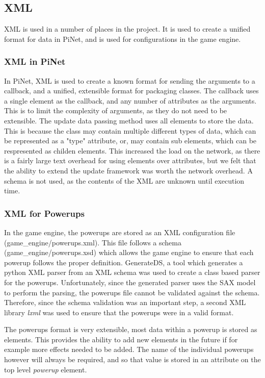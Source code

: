 \documentclass[letterpaper,fleqn]{article}
\begin{document}
\subsection{XML}
XML is used in a number of places in the project. It is used to create a unified format for data in PiNet, and is used for configurations in the game engine.
\subsubsection{XML in PiNet}
In PiNet, XML is used to create a known format for sending the arguments to a callback, and a unified, extensible format for packaging classes. The callback uses a single element as the callback, and any number of attributes as the arguments. This is to limit the complexity of arguments, as they do not need to be extensible. The update data passing method uses all elements to store the data. This is because the class may contain multiple different types of data, which can be represented as a "type" attribute, or, may contain sub elements, which can be respresented as childen elements. This increased the load on the network, as there is a fairly large text overhead for using elements over attributes, but we felt that the ability to extend the update framework was worth the network overhead. A schema is not used, as the contents of the XML are unknown until execution time.
\subsubsection{XML for Powerups}
In the game engine, the powerups are stored as an XML configuration file (game\_engine/powerups.xml). This file follows a schema (game\_engine/powerups.xsd) which allows the game engine to ensure that each powerup follows the proper definition. GenerateDS, a tool which generates a python XML parser from an XML schema was used to create a class based parser for the powerups. Unfortunately, since the generated parser uses the SAX model to perform the parsing, the powerups file cannot be validated against the schema. Therefore, since the schema validation was an important step, a second XML library \textit{lxml} was used to ensure that the powerups were in a valid format.

The powerups format is very extensible, most data within a powerup is stored as elements. This provides the ability to add new elements in the future if for example more effects needed to be added. The name of the individual powerups however will always be required, and so that value is stored in an attribute on the top level \textit{powerup} element.
\end{document}
